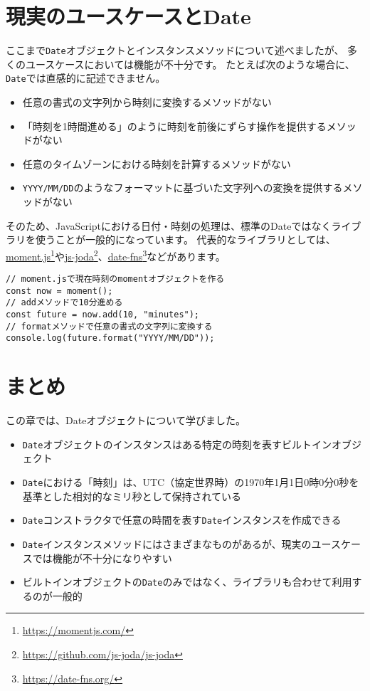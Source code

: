 \hypertarget{usecase}{%
\section{現実のユースケースとDate}\label{usecase}}

ここまで\texttt{Date}オブジェクトとインスタンスメソッドについて述べましたが、
多くのユースケースにおいては機能が不十分です。
たとえば次のような場合に、\texttt{Date}では直感的に記述できません。

\begin{itemize}
\item
  任意の書式の文字列から時刻に変換するメソッドがない
\item
  「時刻を1時間進める」のように時刻を前後にずらす操作を提供するメソッドがない
\item
  任意のタイムゾーンにおける時刻を計算するメソッドがない
\item
  \texttt{YYYY/MM/DD}のようなフォーマットに基づいた文字列への変換を提供するメソッドがない
\end{itemize}

そのため、JavaScriptにおける日付・時刻の処理は、標準のDateではなくライブラリを使うことが一般的になっています。
代表的なライブラリとしては、\href{https://momentjs.com/}{moment.js}\footnote{\url{https://momentjs.com/}}や\href{https://github.com/js-joda/js-joda}{js-joda}\footnote{\url{https://github.com/js-joda/js-joda}}、\href{https://date-fns.org/}{date-fns}\footnote{\url{https://date-fns.org/}}などがあります。

\begin{lstlisting}
// moment.jsで現在時刻のmomentオブジェクトを作る
const now = moment();
// addメソッドで10分進める
const future = now.add(10, "minutes");
// formatメソッドで任意の書式の文字列に変換する
console.log(future.format("YYYY/MM/DD")); 
\end{lstlisting}

\hypertarget{conclusion}{%
\section{まとめ}\label{conclusion}}

この章では、Dateオブジェクトについて学びました。

\begin{itemize}
\item
  \texttt{Date}オブジェクトのインスタンスはある特定の時刻を表すビルトインオブジェクト
\item
  \texttt{Date}における「時刻」は、UTC（協定世界時）の1970年1月1日0時0分0秒を基準とした相対的なミリ秒として保持されている
\item
  \texttt{Date}コンストラクタで任意の時間を表す\texttt{Date}インスタンスを作成できる
\item
  \texttt{Date}インスタンスメソッドにはさまざまなものがあるが、現実のユースケースでは機能が不十分になりやすい
\item
  ビルトインオブジェクトの\texttt{Date}のみではなく、ライブラリも合わせて利用するのが一般的
\end{itemize}
